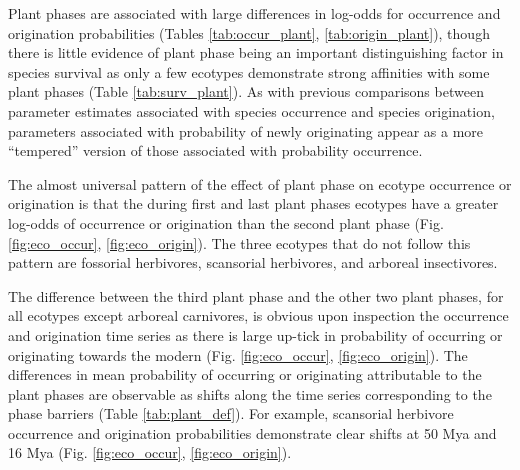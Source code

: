 \documentclass[12pt,letterpaper]{article}
\begin{document}
Plant phases are associated with large differences in log-odds for occurrence and origination probabilities (Tables \ref{tab:occur_plant}, \ref{tab:origin_plant}), though there is little evidence of plant phase being an important distinguishing factor in species survival as only a few ecotypes demonstrate strong affinities with some plant phases (Table \ref{tab:surv_plant}). As with previous comparisons between parameter estimates associated with species occurrence and species origination, parameters associated with probability of newly originating appear as a more ``tempered'' version of those associated with probability occurrence. 

The almost universal pattern of the effect of plant phase on ecotype occurrence or origination is that the during first and last plant phases ecotypes have a greater log-odds of occurrence or origination than the second plant phase (Fig. \ref{fig:eco_occur}, \ref{fig:eco_origin}). The three ecotypes that do not follow this pattern are fossorial herbivores, scansorial herbivores, and arboreal insectivores.

The difference between the third plant phase and the other two plant phases, for all ecotypes except arboreal carnivores, is obvious upon inspection the occurrence and origination time series as there is large up-tick in probability of occurring or originating towards the modern (Fig. \ref{fig:eco_occur}, \ref{fig:eco_origin}). The differences in mean probability of occurring or originating attributable to the plant phases are observable as shifts along the time series corresponding to the phase barriers (Table \ref{tab:plant_def}). For example, scansorial herbivore occurrence and origination probabilities demonstrate clear shifts at 50 Mya and 16 Mya (Fig. \ref{fig:eco_occur}, \ref{fig:eco_origin}).
\end{document}
